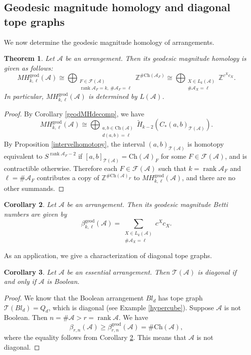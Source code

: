 \documentclass{amsart}
\numberwithin{equation}{section}
\newtheorem{thm}{Theorem}[section]
\newtheorem{cor}[thm]{Corollary}
\theoremstyle{plain}
\theoremstyle{remark}
\theoremstyle{definition}
\numberwithin{equation}{section}
\newcommand{\A}{\mathcal{A}}
\newcommand{\T}{\mathcal{T}}
\newcommand{\FF}{\mathcal{F}}
\newcommand{\Z}{\mathbb{Z}}
\newcommand{\geod}{\mathrm{geod}}
\newcommand{\Ch}{\mathrm{Ch}}
\DeclareMathOperator{\rank}{rank}
\begin{document}
\subsection{Geodesic magnitude homology and diagonal tope graphs}

We now determine the geodesic magnitude homology of arrangements.

\begin{thm}
    Let $\A$ be an arrangement. Then its geodesic magnitude homology is given as follows:
    \[
    MH_{k,\ell}^{\geod}(\A)\cong \bigoplus_{\substack{F\in\FF(\A)\\ \rank \A_F=k,\ \#\A_F=\ell}}\Z^{\#\Ch(\A_F)}
    \cong
    \bigoplus_{\substack{X\in L_k(\A)\\\#\A_X=\ell}}\Z^{c^Xc_X}.
    \]
    In particular, $MH_{k,\ell}^{\geod}(\A)$ is determined by $L(\A)$.
\end{thm}

\begin{proof}
    By Corollary \ref{geodMHdecomp}, we have
    \[
    MH_{k,\ell}^{\geod}(\A)\cong \bigoplus_{\substack{a,b\in\Ch(\A)\\ d(a,b)=\ell}}\widetilde{H}_{k-2}(C_*(a,b)_{\T(\A)}).
    \]
    By Proposition \ref{intervelhomotopy}, the interval $(a,b)_{\T(\A)}$ is homotopy equivalent to $S^{\rank \A_F-2}$ if $[a,b]_{\T(\A)}=\Ch(\A)_F$ for some $F\in\FF(\A)$, and is contractible otherwise. 
    Therefore each $F\in\FF(\A)$ such that $k=\rank \A_F$ and $\ell=\#\A_F$ contributes a copy of $\Z^{\#\Ch(\A)_F}$ to $MH_{k,\ell}^{\geod}(\A)$, and there are no other summands.
\end{proof}

\begin{cor}\label{geodbetti}
    Let $\A$ be an arrangement. Then its geodesic magnitude Betti numbers are given by
    \[
    \beta_{k,\ell}^{\geod}(\A)=\sum_{\substack{X\in L_k(\A)\\ \#\A_X=\ell}}c^Xc_X.
    \]
\end{cor}

As an application, we give a characterization of diagonal tope graphs.

\begin{cor}\label{booleaniffdiagonal}
     Let $\A$ be an essential arrangement. Then $\T(\A)$ is diagonal if and only if $\A$ is Boolean.
\end{cor}
\begin{proof}
    We know that the Boolean arrangement $Bl_d$ has tope graph $\T(Bl_d)=Q_d$, which is diagonal (see Example \ref{hypercube}). Suppose $\A$ is not Boolean. Then $n=\#\A>r=\rank \A$. We have
    \[
    \beta_{r,n}(\A)\geq \beta_{r,n}^{\geod}(\A)=\#\Ch(\A),
    \]
    where the equality follows from Corollary \ref{geodbetti}. This means that $\A$ is not diagonal.
\end{proof}
\end{document}
